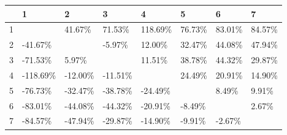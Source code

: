 \begin{table}[ht]
\centering
\begin{tabular}{rlllllll}
  \hline
 & 1 & 2 & 3 & 4 & 5 & 6 & 7 \\ 
  \hline
1 &  & 41.67\% & 71.53\% & 118.69\% & 76.73\% & 83.01\% & 84.57\% \\ 
  2 & -41.67\% &  & -5.97\% & 12.00\% & 32.47\% & 44.08\% & 47.94\% \\ 
  3 & -71.53\% & 5.97\% &  & 11.51\% & 38.78\% & 44.32\% & 29.87\% \\ 
  4 & -118.69\% & -12.00\% & -11.51\% &  & 24.49\% & 20.91\% & 14.90\% \\ 
  5 & -76.73\% & -32.47\% & -38.78\% & -24.49\% &  & 8.49\% & 9.91\% \\ 
  6 & -83.01\% & -44.08\% & -44.32\% & -20.91\% & -8.49\% &  & 2.67\% \\ 
  7 & -84.57\% & -47.94\% & -29.87\% & -14.90\% & -9.91\% & -2.67\% &  \\ 
   \hline
\end{tabular}
\end{table}
